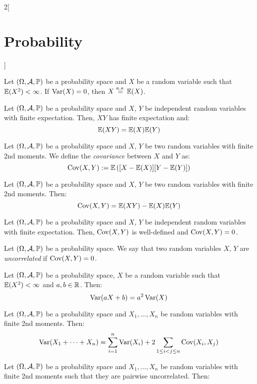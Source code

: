 \documentclass[../../../main.tex]{subfiles}
\begin{document}
\begin{multicols}{2}[\section{Probability}]
\begin{definition}
    \end{definition}
    \begin{prop}
        Let $(\Omega,\mathcal{A},\mathbb{P})$ be a probability space and $X$ be a random variable such that $\mathbb{E}(X^2)<\infty$. If $\operatorname{Var}(X)=0$, then $X\overset{a.s.}{=}\mathbb{E}(X)$.
    \end{prop}
    \begin{prop}
        Let $(\Omega,\mathcal{A},\mathbb{P})$ be a probability space and $X$, $Y$ be independent random variables with finite expectation. Then, $XY$ has finite expectation and: $$\mathbb{E}(XY)=\mathbb{E}(X)\mathbb{E}(Y)$$
    \end{prop}
    \begin{definition}[Covariance]
        Let $(\Omega,\mathcal{A},\mathbb{P})$ be a probability space and $X$, $Y$ be two random variables with finite 2nd moments. We define the \textit{covariance} between $X$ and $Y$ as: $$\operatorname{Cov}(X,Y):=\mathbb{E}\left([X-\mathbb{E}(X)][Y-\mathbb{E}(Y)]\right)$$
    \end{definition}
    \begin{prop}
        Let $(\Omega,\mathcal{A},\mathbb{P})$ be a probability space and $X$, $Y$ be two random variables with finite 2nd moments. Then: $$\operatorname{Cov}(X,Y)=\mathbb{E}(XY)-\mathbb{E}(X)\mathbb{E}(Y)$$
    \end{prop}
    \begin{prop}
        Let $(\Omega,\mathcal{A},\mathbb{P})$ be a probability space and $X$, $Y$ be independent random variables with finite expectation. Then, $\operatorname{Cov}(X,Y)$ is well-defined and $\operatorname{Cov}(X,Y)=0$.
    \end{prop}
    \begin{definition}
        Let $(\Omega,\mathcal{A},\mathbb{P})$ be a probability space. We say that two random variables $X$, $Y$ are \textit{uncorrelated} if $\operatorname{Cov}(X,Y)=0$.
    \end{definition}
    \begin{prop}
        Let $(\Omega,\mathcal{A},\mathbb{P})$ be a probability space, $X$ be a random variable such that $\mathbb{E}(X^2)<\infty$ and $a,b\in\mathbb{R}$. Then: $$\operatorname{Var}(aX+b)=a^2\operatorname{Var}(X)$$
    \end{prop}
    \begin{prop}
        Let $(\Omega,\mathcal{A},\mathbb{P})$ be a probability space and $X_1,\ldots,X_n$ be random variables with finite 2nd moments. Then:
        $$\operatorname{Var}(X_1+\cdots+X_n)=\sum_{i=1}^n\operatorname{Var}(X_i)+2\sum_{1\leq i<j\leq n}\operatorname{Cov}(X_i,X_j)$$
    \end{prop}
    \begin{corollary}
        Let $(\Omega,\mathcal{A},\mathbb{P})$ be a probability space and $X_1,\ldots,X_n$ be random variables with finite 2nd moments such that they are pairwise uncorrelated. Then:

\end{corollary}
\end{multicols}
\end{document}

